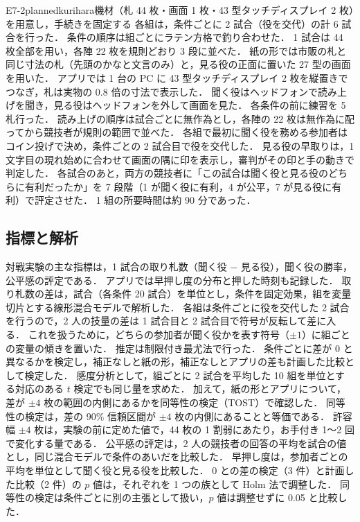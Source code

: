 \begin{fd}{E7-2}{planned}{kurihara}{機材（札 44 枚・画面 1 枚・43 型タッチディスプレイ 2 枚）を用意し，手続きを固定する}
各組は，条件ごとに 2 試合（役を交代）の計 6 試合を行った．
条件の順序は組ごとにラテン方格で釣り合わせた．
1 試合は 44 枚全部を用い，各陣 22 枚を規則どおり 3 段に並べた．
紙の形では市販の札と同じ寸法の札（先頭のかなと文言のみ）と，見る役の正面に置いた 27 型の画面を用いた．
アプリでは 1 台の PC に 43 型タッチディスプレイ 2 枚を縦置きでつなぎ，札は実物の 0.8 倍の寸法で表示した．
聞く役はヘッドフォンで読み上げを聞き，見る役はヘッドフォンを外して画面を見た．
各条件の前に練習を 5 札行った．
読み上げの順序は試合ごとに無作為とし，各陣の 22 枚は無作為に配ってから競技者が規則の範囲で並べた．
各組で最初に聞く役を務める参加者はコイン投げで決め，条件ごとの 2 試合目で役を交代した．
見る役の早取りは，1 文字目の現れ始めに合わせて画面の隅に印を表示し，審判がその印と手の動きで判定した．
各試合のあと，両方の競技者に「この試合は聞く役と見る役のどちらに有利だったか」を 7 段階（1 が聞く役に有利，4 が公平，7 が見る役に有利）で評定させた．
1 組の所要時間は約 90 分であった．
\end{fd}

\subsection{指標と解析}

対戦実験の主な指標は，1 試合の取り札数（聞く役 $-$ 見る役），聞く役の勝率，公平感の評定である．
アプリでは早押し度の分布と押した時刻も記録した．
取り札数の差は，試合（各条件 20 試合）を単位とし，条件を固定効果，組を変量切片とする線形混合モデルで解析した．
各組は条件ごとに役を交代した 2 試合を行うので，2 人の技量の差は 1 試合目と 2 試合目で符号が反転して差に入る．
これを扱うために，どちらの参加者が聞く役かを表す符号（$\pm 1$）に組ごとの変量の傾きを置いた．
推定は制限付き最尤法で行った．
条件ごとに差が 0 と異なるかを検定し，補正なしと紙の形，補正なしとアプリの差も計画した比較として検定した．
感度分析として，組ごとに 2 試合を平均した 10 組を単位とする対応のある $t$ 検定でも同じ量を求めた．
加えて，紙の形とアプリについて，差が $\pm 4$ 枚の範囲の内側にあるかを同等性の検定（TOST\cite{lakens2017}）で確認した．
同等性の検定は，差の 90\% 信頼区間が $\pm 4$ 枚の内側にあることと等価である．
許容幅 $\pm 4$ 枚は，実験の前に定めた値で，44 枚の 1 割弱にあたり，お手付き 1〜2 回で変化する量である．
公平感の評定は，2 人の競技者の回答の平均を試合の値とし，同じ混合モデルで条件のあいだを比較した．
早押し度は，参加者ごとの平均を単位として聞く役と見る役を比較した．
0 との差の検定（3 件）と計画した比較（2 件）の $p$ 値は，それぞれを 1 つの族として Holm 法で調整した．
同等性の検定は条件ごとに別の主張として扱い，$p$ 値は調整せずに 0.05 と比較した．

